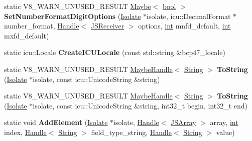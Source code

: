 \begin{DoxyCompactItemize}
\item 
\mbox{\label{classv8_1_1internal_1_1Intl_ae3b5c6d63a7564a930bf0e96c2833fcc}} 
static V8\+\_\+\+W\+A\+R\+N\+\_\+\+U\+N\+U\+S\+E\+D\+\_\+\+R\+E\+S\+U\+LT \mbox{\hyperlink{classv8_1_1Maybe}{Maybe}}$<$ \mbox{\hyperlink{classbool}{bool}} $>$ {\bfseries Set\+Number\+Format\+Digit\+Options} (\mbox{\hyperlink{classv8_1_1internal_1_1Isolate}{Isolate}} $\ast$isolate, icu\+::\+Decimal\+Format $\ast$number\+\_\+format, \mbox{\hyperlink{classv8_1_1internal_1_1Handle}{Handle}}$<$ \mbox{\hyperlink{classv8_1_1internal_1_1JSReceiver}{J\+S\+Receiver}} $>$ options, \mbox{\hyperlink{classint}{int}} mnfd\+\_\+default, \mbox{\hyperlink{classint}{int}} mxfd\+\_\+default)
\item 
\mbox{\label{classv8_1_1internal_1_1Intl_a8c90ad00b4e2708ad54e8ce7df42e79a}} 
static icu\+::\+Locale {\bfseries Create\+I\+C\+U\+Locale} (const std\+::string \&bcp47\+\_\+locale)
\item 
\mbox{\label{classv8_1_1internal_1_1Intl_a31799f9a30b4169d1ea6919debdc6591}} 
static V8\+\_\+\+W\+A\+R\+N\+\_\+\+U\+N\+U\+S\+E\+D\+\_\+\+R\+E\+S\+U\+LT \mbox{\hyperlink{classv8_1_1internal_1_1MaybeHandle}{Maybe\+Handle}}$<$ \mbox{\hyperlink{classv8_1_1internal_1_1String}{String}} $>$ {\bfseries To\+String} (\mbox{\hyperlink{classv8_1_1internal_1_1Isolate}{Isolate}} $\ast$isolate, const icu\+::\+Unicode\+String \&string)
\item 
\mbox{\label{classv8_1_1internal_1_1Intl_a976f21c6e075eb136a4c4fda8c9d238b}} 
static V8\+\_\+\+W\+A\+R\+N\+\_\+\+U\+N\+U\+S\+E\+D\+\_\+\+R\+E\+S\+U\+LT \mbox{\hyperlink{classv8_1_1internal_1_1MaybeHandle}{Maybe\+Handle}}$<$ \mbox{\hyperlink{classv8_1_1internal_1_1String}{String}} $>$ {\bfseries To\+String} (\mbox{\hyperlink{classv8_1_1internal_1_1Isolate}{Isolate}} $\ast$isolate, const icu\+::\+Unicode\+String \&string, int32\+\_\+t begin, int32\+\_\+t end)
\item 
\mbox{\label{classv8_1_1internal_1_1Intl_aa4ba7aa7a17ab4376e7143d75a811815}} 
static void {\bfseries Add\+Element} (\mbox{\hyperlink{classv8_1_1internal_1_1Isolate}{Isolate}} $\ast$isolate, \mbox{\hyperlink{classv8_1_1internal_1_1Handle}{Handle}}$<$ \mbox{\hyperlink{classv8_1_1internal_1_1JSArray}{J\+S\+Array}} $>$ array, \mbox{\hyperlink{classint}{int}} index, \mbox{\hyperlink{classv8_1_1internal_1_1Handle}{Handle}}$<$ \mbox{\hyperlink{classv8_1_1internal_1_1String}{String}} $>$ field\+\_\+type\+\_\+string, \mbox{\hyperlink{classv8_1_1internal_1_1Handle}{Handle}}$<$ \mbox{\hyperlink{classv8_1_1internal_1_1String}{String}} $>$ value)

\end{DoxyCompactItemize}
